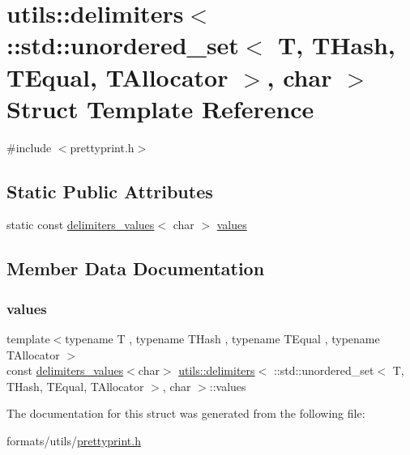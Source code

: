 \hypertarget{structutils_1_1delimiters_3_01_1_1std_1_1unordered__set_3_01_t_00_01_t_hash_00_01_t_equal_00_01_t_allocator_01_4_00_01char_01_4}{}\section{utils\+::delimiters$<$ \+::std\+::unordered\+\_\+set$<$ T, T\+Hash, T\+Equal, T\+Allocator $>$, char $>$ Struct Template Reference}
\label{structutils_1_1delimiters_3_01_1_1std_1_1unordered__set_3_01_t_00_01_t_hash_00_01_t_equal_00_01_t_allocator_01_4_00_01char_01_4}


{\ttfamily \#include $<$prettyprint.\+h$>$}

\subsection*{Static Public Attributes}
\begin{DoxyCompactItemize}
\item 
static const \mbox{\hyperlink{structutils_1_1delimiters__values}{delimiters\+\_\+values}}$<$ char $>$ \mbox{\hyperlink{structutils_1_1delimiters_3_01_1_1std_1_1unordered__set_3_01_t_00_01_t_hash_00_01_t_equal_00_01_t_allocator_01_4_00_01char_01_4_a998c3e26554a8497fe1b6641e6bb0130}{values}}
\end{DoxyCompactItemize}


\subsection{Member Data Documentation}
\mbox{\label{structutils_1_1delimiters_3_01_1_1std_1_1unordered__set_3_01_t_00_01_t_hash_00_01_t_equal_00_01_t_allocator_01_4_00_01char_01_4_a998c3e26554a8497fe1b6641e6bb0130}} 
\subsubsection{\texorpdfstring{values}{values}}
{\footnotesize\ttfamily template$<$typename T , typename T\+Hash , typename T\+Equal , typename T\+Allocator $>$ \\
const \mbox{\hyperlink{structutils_1_1delimiters__values}{delimiters\+\_\+values}}$<$char$>$ \mbox{\hyperlink{structutils_1_1delimiters}{utils\+::delimiters}}$<$ \+::std\+::unordered\+\_\+set$<$ T, T\+Hash, T\+Equal, T\+Allocator $>$, char $>$\+::values\hspace{0.3cm}{\ttfamily [static]}}



The documentation for this struct was generated from the following file\+:\begin{DoxyCompactItemize}
\item 
formats/utils/\mbox{\hyperlink{prettyprint_8h}{prettyprint.\+h}}\end{DoxyCompactItemize}
